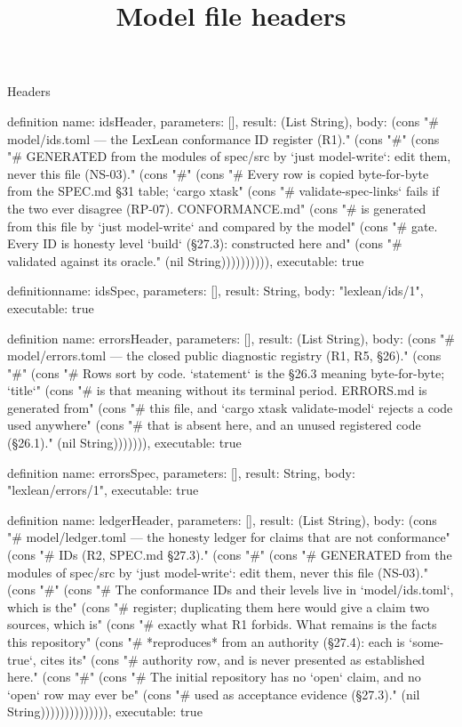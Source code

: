 \begin{lexlean}{Headers}
\title{Model file headers}
\begin{semanticmodule}
definition{
  name: idsHeader,
  parameters: [],
  result: (List String),
  body: (cons "# model/ids.toml --- the LexLean conformance ID register (R1)." (cons "#" (cons "# GENERATED from the modules of spec/src by `just model-write`: edit them, never this file (NS-03)." (cons "#" (cons "# Every row is copied byte-for-byte from the SPEC.md §31 table; `cargo xtask" (cons "# validate-spec-links` fails if the two ever disagree (RP-07). CONFORMANCE.md" (cons "# is generated from this file by `just model-write` and compared by the model" (cons "# gate. Every ID is honesty level `build` (§27.3): constructed here and" (cons "# validated against its oracle." (nil String)))))))))),
  executable: true
}

definition{name: idsSpec, parameters: [], result: String, body: "lexlean/ids/1", executable: true}

definition{
  name: errorsHeader,
  parameters: [],
  result: (List String),
  body: (cons "# model/errors.toml --- the closed public diagnostic registry (R1, R5, §26)." (cons "#" (cons "# Rows sort by code. `statement` is the §26.3 meaning byte-for-byte; `title`" (cons "# is that meaning without its terminal period. ERRORS.md is generated from" (cons "# this file, and `cargo xtask validate-model` rejects a code used anywhere" (cons "# that is absent here, and an unused registered code (§26.1)." (nil String))))))),
  executable: true
}

definition{
  name: errorsSpec,
  parameters: [],
  result: String,
  body: "lexlean/errors/1",
  executable: true
}

definition{
  name: ledgerHeader,
  parameters: [],
  result: (List String),
  body: (cons "# model/ledger.toml --- the honesty ledger for claims that are not conformance" (cons "# IDs (R2, SPEC.md §27.3)." (cons "#" (cons "# GENERATED from the modules of spec/src by `just model-write`: edit them, never this file (NS-03)." (cons "#" (cons "# The conformance IDs and their levels live in `model/ids.toml`, which is the" (cons "# register; duplicating them here would give a claim two sources, which is" (cons "# exactly what R1 forbids. What remains is the facts this repository" (cons "# *reproduces* from an authority (§27.4): each is `some-true`, cites its" (cons "# authority row, and is never presented as established here." (cons "#" (cons "# The initial repository has no `open` claim, and no `open` row may ever be" (cons "# used as acceptance evidence (§27.3)." (nil String)))))))))))))),
  executable: true
}


\end{semanticmodule}
\end{lexlean}
